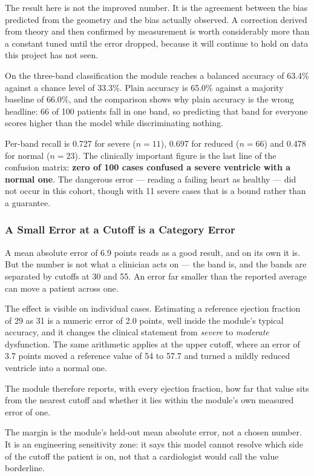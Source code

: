 The result here is not the improved number. It is the agreement between the bias predicted from
the geometry and the bias actually observed. A correction derived from theory and then confirmed
by measurement is worth considerably more than a constant tuned until the error dropped, because
it will continue to hold on data this project has not seen.

On the three-band classification the module reaches a balanced accuracy of 63.4\% against a
chance level of 33.3\%. Plain accuracy is 65.0\% against a majority baseline of 66.0\%, and the
comparison shows why plain accuracy is the wrong headline: 66 of 100 patients fall in one band,
so predicting that band for everyone scores higher than the model while discriminating nothing.

Per-band recall is 0.727 for severe ($n=11$), 0.697 for reduced ($n=66$) and 0.478 for normal
($n=23$). The clinically important figure is the last line of the confusion matrix: \textbf{zero
of 100 cases confused a severe ventricle with a normal one}. The dangerous error --- reading a
failing heart as healthy --- did not occur in this cohort, though with 11 severe cases that is
a bound rather than a guarantee.

\subsubsection{A Small Error at a Cutoff is a Category Error}
\label{subsec:cardiac-boundary}

A mean absolute error of 6.9 points reads as a good result, and on its own it is. But the number
is not what a clinician acts on --- the band is, and the bands are separated by cutoffs at 30
and 55. An error far smaller than the reported average can move a patient across one.

The effect is visible on individual cases. Estimating a reference ejection fraction of 29 as 31
is a numeric error of 2.0 points, well inside the module's typical accuracy, and it changes the
clinical statement from \emph{severe} to \emph{moderate} dysfunction. The same arithmetic
applies at the upper cutoff, where an error of 3.7 points moved a reference value of 54 to 57.7
and turned a mildly reduced ventricle into a normal one.

The module therefore reports, with every ejection fraction, how far that value sits from the
nearest cutoff and whether it lies within the module's own measured error of one.

\begin{keystatement}
The margin is the module's held-out mean absolute error, not a chosen number. It is an
engineering sensitivity zone: it says this model cannot resolve which side of the cutoff the
patient is on, not that a cardiologist would call the value borderline.
\end{keystatement}

